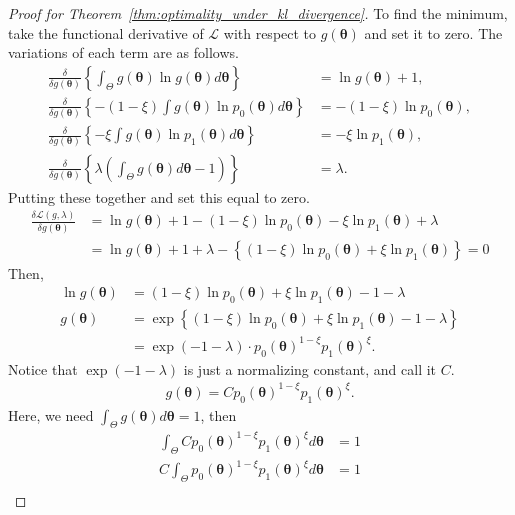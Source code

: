 \documentclass[12pt]{article}
\begin{document}
\begin{proof}[Proof for Theorem~\ref{thm:optimality_under_kl_divergence}]
    To find the minimum, take the functional derivative of $\mathcal{L}$ with respect to $g(\bm{\theta})$ and set it to zero.
    The variations of each term are as follows.
    \begin{align*}
        \frac{\delta}{\delta g(\bm{\theta})}\left\{\int_\Theta g(\bm{\theta})\ln g(\bm{\theta}) d\bm{\theta} \right\} &= \ln g(\bm{\theta}) + 1, \\
        \frac{\delta}{\delta g(\bm{\theta})}\left\{ - (1 - \xi) \int g(\bm{\theta}) \ln p_0(\bm{\theta})d\bm{\theta} \right\} &= -(1 - \xi) \ln p_0(\bm{\theta}), \\
        \frac{\delta}{\delta g(\bm{\theta})}\left\{ - \xi \int g(\bm{\theta})\ln p_1(\bm{\theta})d\bm{\theta} \right\} &= -\xi \ln p_1(\bm{\theta}), \\
        \frac{\delta}{\delta g(\bm{\theta})}\left\{ \lambda \left(\int_\Theta g(\bm{\theta})d\bm{\theta} - 1\right) \right\} &= \lambda.
    \end{align*}
    Putting these together and set this equal to zero.
    \begin{align*}
        \frac{\delta \mathcal{L}(g, \lambda)}{\delta g(\bm{\theta})} &= \ln g(\bm{\theta}) + 1 -(1 - \xi) \ln p_0(\bm{\theta}) -\xi \ln p_1(\bm{\theta}) + \lambda \\
        &= \ln g(\bm{\theta}) + 1 + \lambda - \left\{(1 - \xi)\ln p_0(\bm{\theta}) + \xi \ln p_1(\bm{\theta}) \right\} = 0
    \end{align*}
    Then,
    \begin{align*}
        \ln g(\bm{\theta}) &= (1 - \xi)\ln p_0(\bm{\theta}) + \xi \ln p_1(\bm{\theta}) - 1 - \lambda \\
        g(\bm{\theta}) &= \exp\left\{(1 - \xi)\ln p_0(\bm{\theta}) + \xi \ln p_1(\bm{\theta}) - 1 - \lambda \right\} \\
        &= \exp(-1 - \lambda) \cdot p_0(\bm{\theta})^{1 - \xi}p_1(\bm{\theta})^\xi.
    \end{align*}
    Notice that $\exp(-1 - \lambda)$ is just a normalizing constant, and call it $C$.
    \begin{align*}
        g(\bm{\theta}) = C p_0(\bm{\theta})^{1 - \xi}p_1(\bm{\theta})^\xi.
    \end{align*}
    Here, we need $\int_\Theta g(\bm{\theta}) d\bm{\theta} = 1$, then
    \begin{align*}
        \int_\Theta C p_0(\bm{\theta})^{1 - \xi}p_1(\bm{\theta})^\xi d\bm{\theta} &= 1 \\
        C \int_\Theta p_0(\bm{\theta})^{1 - \xi}p_1(\bm{\theta})^\xi d\bm{\theta} &= 1 \\

\end{align*}
\end{proof}
\end{document}
